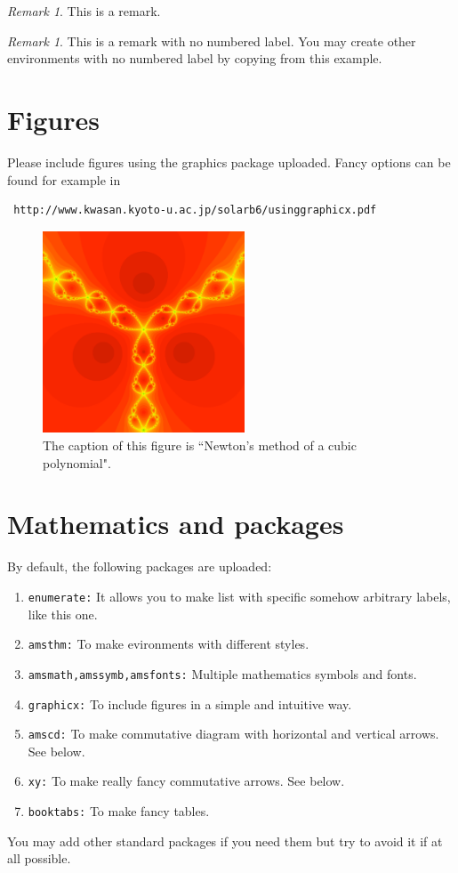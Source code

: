 \documentclass[12,twoside]{mammeTFM}
\theoremstyle{definition}
\theoremstyle{remark}
\newtheorem{remark}[theorem]{Remark}
\newtheorem*{remarknonumber}{Remark}
\begin{document}
\begin{remark}
This is a remark. 
\end{remark}

\begin{remarknonumber}
This is a remark with no numbered label. You may create other environments with no numbered label by copying from this example.
\end{remarknonumber}

\section{Figures}

Please include figures using the graphics package uploaded.  Fancy options can be found for example in  \begin{verbatim} http://www.kwasan.kyoto-u.ac.jp/solarb6/usinggraphicx.pdf \end{verbatim}

\begin{figure}[htb!]
\begin{center}
\includegraphics[width=6cm]{samplefigure.pdf}
\end{center}
\caption{\label{sample figure} \small The caption of this figure is ``Newton's method of a cubic polynomial".}
\end{figure}

\section{Mathematics and packages} \label{packages}

By default, the following packages are uploaded:
\begin{enumerate}[\bf (1)]
\item {\tt enumerate:} It allows you to make list with specific somehow arbitrary labels, like this one.
\item {\tt amsthm:} To make evironments with different styles.
\item {\tt amsmath,amssymb,amsfonts:} Multiple mathematics symbols and fonts.
\item {\tt graphicx:} To include figures in a simple and intuitive way.
\item {\tt amscd:} To make commutative diagram with horizontal and vertical arrows. See below.
\item {\tt xy:} To make really fancy commutative arrows. See below.
\item {\tt booktabs:} To make fancy tables.
\end{enumerate}
You may add other standard packages if you need them but try to avoid it if at all possible.
\end{document}
